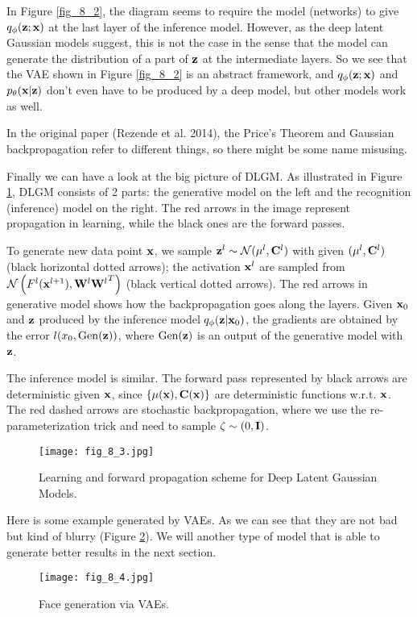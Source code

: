 \documentclass[../main.tex]{subfiles}
\begin{document}
\begin{remark}\label{rmk_8_1}
	In Figure \ref{fig_8_2}, the diagram seems to require the model (networks) to give $q_\phi({\bf z};{\bf x})$  at the last layer of the inference model. However, as the deep latent Gaussian models suggest, this is not the case in the sense that the model can generate the distribution of a part of ${\bf z}$ at the intermediate layers. So we see that the VAE shown in Figure \ref{fig_8_2} is an abstract framework, and $q_\phi({\bf z};{\bf x})$ and $p_\theta({\bf x}|{\bf z})$ don't even have to be produced by a deep model, but other models work as well.
\end{remark}
\begin{remark}
	In the original paper (Rezende et al. 2014), the Price's Theorem and Gaussian backpropagation refer to different things, so there might be some name misusing.
\end{remark}
Finally we can have a look at the big picture of DLGM. As illustrated in Figure \ref{fig_8_3}, DLGM consists of 2 parts: the generative model on the left and the recognition (inference) model on the right. The red arrows in the image represent propagation in learning, while the black ones are the forward passes. 
\par To generate new data point ${\bf x}$, we sample ${\bf z}^l\sim \mathcal{N}(\mu^l,{\bf C}^l)$ with given $(\mu^l,{\bf C}^l)$ (black horizontal dotted arrows); the activation ${\bf x}^l$ are sampled from $ \mathcal{N}\left(F^l({\bf x}^{l+1}),{{\bf W}^l{\bf W}^l}^T\right)$ (black vertical dotted arrows). The red arrows in generative model shows how the backpropagation goes along the layers. Given ${\bf x}_0$ and ${\bf z}$ produced by the inference model $q_\phi({\bf z}|{\bf x}_0)$, the gradients are obtained by the error $l(x_0,{\rm Gen}({\bf z}))$, where ${\rm Gen}({\bf z})$ is an output of the generative model with ${\bf z}$.
\par The inference model is similar. The forward pass represented by black arrows are deterministic given ${\bf x}$, since $\{\mu({\bf x}), {\bf C}({\bf x})\}$ are deterministic functions w.r.t. ${\bf x}$. The red dashed arrows are stochastic backpropagation, where we use the re-parameterization trick and need to sample $\zeta\sim \mathcal(0,{\bf I})$.
\begin{figure}[h] 
	\centering 
	\texttt{[image: fig\_8\_3.jpg]} 
	\caption{Learning and forward propagation scheme for Deep Latent Gaussian Models.}\label{fig_8_3}
\end{figure}
\par Here is some example generated by VAEs. As we can see that they are not bad but kind of blurry (Figure \ref{fig_8_4}). We will another type of model that is able to generate better results in the next section.
\begin{figure}[h] 
	\centering 
	\texttt{[image: fig\_8\_4.jpg]} 
	\caption{Face generation via VAEs.}\label{fig_8_4}
\end{figure}
\end{document}
